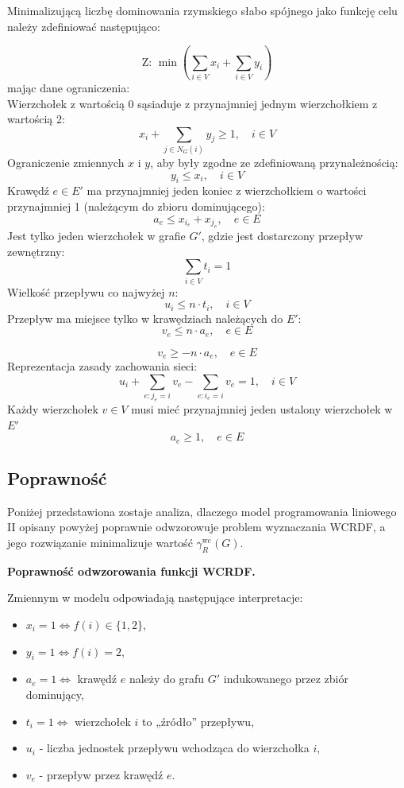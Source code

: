 Minimalizującą liczbę dominowania rzymskiego słabo spójnego jako funkcję celu należy zdefiniować następująco:

\[
\text{Z: } \min \left( \sum_{i \in V} x_i + \sum_{i \in V} y_i \right)
\]
mając dane ograniczenia:\\
Wierzchołek z wartością 0 sąsiaduje z przynajmniej jednym wierzchołkiem z wartością 2:
\[
x_i + \sum_{j \in N_G(i)} y_j \geq 1, \quad i \in V \tag{1}
\]
Ograniczenie zmiennych $x$ i $y$, aby były zgodne ze zdefiniowaną przynależnością:
\[
y_i \leq x_i, \quad i \in V \tag{2}
\]
Krawędź $e \in E'$ ma przynajmniej jeden koniec z wierzchołkiem o wartości przynajmniej 1 (należącym do zbioru dominującego):
\[
a_e \leq x_{i_e} + x_{j_e}, \quad e \in E \tag{3}
\]
Jest tylko jeden wierzchołek w grafie $G'$, gdzie jest dostarczony przepływ zewnętrzny:
\[
\sum_{i \in V} t_i = 1 \tag{4}
\]
Wielkość przepływu co najwyżej $n$:
\[
u_i \leq n \cdot t_i, \quad i \in V \tag{5}
\]
Przepływ ma miejsce tylko w krawędziach należących do $E'$:
\[
v_e \leq n \cdot a_e, \quad e \in E \tag{6}
\]

\[
v_e \geq -n \cdot a_e, \quad e \in E \tag{7}
\]
Reprezentacja zasady zachowania sieci:
\[
u_i + \sum_{e: j_e = i} v_e - \sum_{e: i_e = i} v_e = 1, \quad i \in V \tag{8}
\]
Każdy wierzchołek $v \in V$ musi mieć przynajmniej jeden ustalony wierzchołek w $E'$
\[
a_e \geq 1, \quad e \in E \tag{9}
\]

\subsection{Poprawność}

Poniżej przedstawiona zostaje analiza, dlaczego model programowania liniowego II opisany
powyżej poprawnie odwzorowuje problem wyznaczania WCRDF, a jego rozwiązanie minimalizuje
wartość $\gamma_R^{\text{wc}}(G)$.

\textbf{Poprawność odwzorowania funkcji WCRDF.}

Zmiennym w modelu odpowiadają następujące interpretacje:
\begin{itemize}
    \item $x_i = 1 \iff f(i) \in \{1,2\}$,
    \item $y_i = 1 \iff f(i) = 2$,
    \item $a_e = 1 \iff$ krawędź $e$ należy do grafu $G'$ indukowanego przez zbiór dominujący,
    \item $t_i = 1 \iff$ wierzchołek $i$ to „źródło” przepływu,
    \item $u_i$ - liczba jednostek przepływu wchodząca do wierzchołka $i$,
    \item $v_e$ - przepływ przez krawędź $e$.
\end{itemize}


